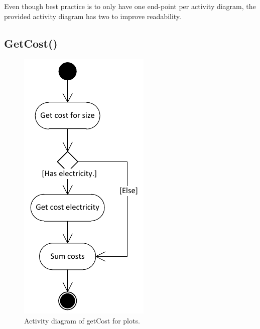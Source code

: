 Even though best practice is to only have one end-point per activity diagram, the provided activity diagram has two to improve readability.

\subsection{GetCost()}

\begin{figure}[H]
\begin{center}
\includegraphics[scale=1]{gfx/activity_diagram_cost.pdf} 
\end{center}
\caption{Activity diagram of getCost for plots.}
\label{fig:actdiag_cost}
\end{figure}